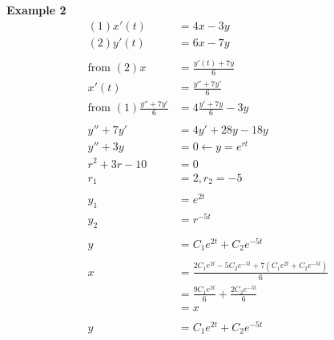 \documentclass[10pt, letterpaper]{article}
\begin{document}
\textbf{Example 2}
\begin{align*}
(1) x'(t) &= 4x-3y\\
(2) y'(t) &= 6x-7y\\
\\
\text{from }(2) x &= \frac{y'(t)+7y}{6}\\
x'(t) &= \frac{y''+7y'}{6}\\
\text{from }(1) \frac{y''+7y'}{6} &= 4\frac{y'+7y}{6} -3y\\
\\
y''+7y' &= 4y'+28y-18y\\
y''+3y &= 0 \leftarrow y=e^{rt}\\
r^2+3r-10 &= 0\\
r_1 &= 2, r_2=-5\\
\\
y_1 &= e^{2t}\\
y_2 &= r^{-5t}\\
\\
y &= C_1e^{2t} +C_2e^{-5t}\\
\\
x &= \frac{2C_1e^{2t}-5C_2e^{-5t}+7(C_1e^{2t}+C_2e^{-5t})}{6}\\
&= \frac{9C_1e^{2t}}{6} +\frac{2C_2e^{-5t}}{6}\\
&= x\\
\\
y &= C_1e^{2t} +C_2e^{-5t}
\end{align*}
\end{document}
